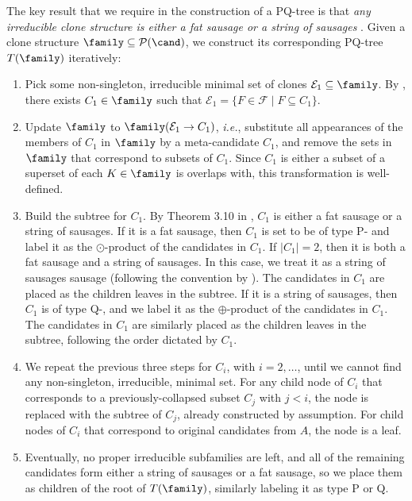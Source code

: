 The key result that we require in the construction of a PQ-tree is that \emph{any irreducible clone structure is either a fat sausage or a string of sausages}   \cite[Thm. 3.10]{Elkind10:Clone}.
Given a clone structure $\family \subseteq \mathcal{P}(\cand)$, we construct its corresponding PQ-tree $T(\family)$ iteratively:
\begin{enumerate}
    \item Pick some non-singleton, irreducible minimal set of clones  $\mathcal{E}_1 \subseteq \family$. By , there exists $C_1 \in \family$ such that $\mathcal{E}_1 = \{F \in \mathcal{F} \mid F \subseteq C_1\}$. 
    \item Update $\family$ to $\family(\mathcal{E}_1 \rightarrow C_1)$, \emph{i.e.}, substitute all appearances of the members of $C_1$ in $\family$ by a meta-candidate $C_1$, and remove the sets in $\family$ that correspond to subsets of $C_1$. Since $C_1$ is either a subset of a superset of each $K \in \family$ is overlaps with, this transformation is well-defined.
    \item Build the subtree for $C_1$. By Theorem 3.10 in \citet{Elkind10:Clone}, $C_1$ is either a fat sausage or a string of sausages.
    If it is a fat sausage, then $C_1$ is set to be of type P- and label it as the $\odot$-product of the candidates in $C_1$. If $|C_1|=2$, then it is both a fat sausage and a string of sausages. 
    In this case, we treat it as a string of sausages sausage (following the convention by \citet{Elkind10:Clone}).
    The candidates in $C_1$ are placed as the children leaves in the subtree.
    If it is a string of sausages, then $C_1$ is of type Q-, and we label it as the $\oplus$-product of the candidates in $C_1$.
    The candidates in $C_1$ are similarly placed as the children leaves in the subtree, following the order dictated by $C_1$.
    \item We repeat the previous three steps for $C_i$, with $i=2,\ldots$,  until we cannot find any non-singleton, irreducible, minimal set. For any child node of $C_i$ that corresponds to a previously-collapsed subset $C_j$ with $j<i$, the node is replaced with the subtree of $C_j$, already constructed by assumption. For child nodes of $C_i$ that correspond to original candidates from $A$, the node is a leaf.
    \item Eventually, no proper irreducible subfamilies are left, and all of the remaining candidates form either a string of sausages or a fat sausage, so we place them as children of the root of $T(\family)$, similarly labeling it as type P or Q. 
\end{enumerate}

